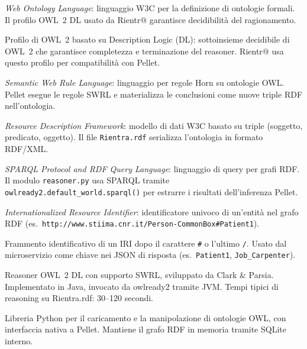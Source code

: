 \documentclass[a4paper,12pt]{article}
\begin{document}
\begin{description}[leftmargin=4cm, labelwidth=3.8cm, labelsep=0.2cm]

\item[\textbf{OWL}]
  \textit{Web Ontology Language}: linguaggio W3C per la definizione di
  ontologie formali. Il profilo OWL~2 DL usato da Rientr@ garantisce
  decidibilit\`{a} del ragionamento.

\item[\textbf{OWL~2 DL}]
  Profilo di OWL~2 basato su Description Logic (DL): sottoinsieme
  decidibile di OWL~2 che garantisce completezza e terminazione del
  reasoner. Rientr@ usa questo profilo per compatibilit\`{a} con Pellet.

\item[\textbf{SWRL}]
  \textit{Semantic Web Rule Language}: linguaggio per regole Horn su
  ontologie OWL. Pellet esegue le regole SWRL e materializza le conclusioni
  come nuove triple RDF nell'ontologia.

\item[\textbf{RDF}]
  \textit{Resource Description Framework}: modello di dati W3C basato su
  triple (soggetto, predicato, oggetto). Il file \texttt{Rientra.rdf}
  serializza l'ontologia in formato RDF/XML.

\item[\textbf{SPARQL}]
  \textit{SPARQL Protocol and RDF Query Language}: linguaggio di query
  per grafi RDF. Il modulo \texttt{reasoner.py} usa SPARQL tramite
  \texttt{owlready2.default\_\allowbreak{}world.sparql()} per estrarre i risultati
  dell'inferenza Pellet.

\item[\textbf{IRI}]
  \textit{Internationalized Resource Identifier}: identificatore univoco
  di un'entit\`{a} nel grafo RDF (es.\
  \texttt{http://www.stiima.cnr.it/Person-CommonBox\#Patient1}).

\item[\textbf{Local name}]
  Frammento identificativo di un IRI dopo il carattere \texttt{\#} o
  l'ultimo \texttt{/}. Usato dal microservizio come chiave nei JSON
  di risposta (es.\ \texttt{Patient1}, \texttt{Job\_Carpenter}).

\item[\textbf{Pellet}]
  Reasoner OWL~2 DL con supporto SWRL, sviluppato da Clark \& Parsia.
  Implementato in Java, invocato da owlready2 tramite JVM. Tempi tipici
  di reasoning su Rientra.rdf: 30--120 secondi.

\item[\textbf{owlready2}]
  Libreria Python per il caricamento e la manipolazione di ontologie OWL,
  con interfaccia nativa a Pellet. Mantiene il grafo RDF in memoria
  tramite SQLite interno.


\end{description}
\end{document}
